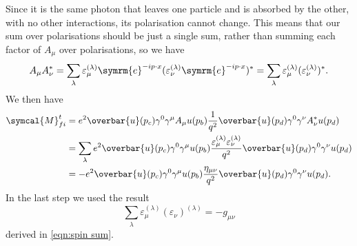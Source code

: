 \documentclass[fleqn]{NotesClass}
\newcommand{\e}{\symrm{e}}
\newcommand{\amplitude}{\symcal{M}}
\newcommand{\diracadjoint}[1]{\overbar{#1}}
\newcommand{\minkowskiMetric}{\eta}
\begin{document}
    Since it is the same photon that leaves one particle and is absorbed by the other, with no other interactions, its polarisation cannot change.
    This means that our sum over polarisations should be just a single sum, rather than summing each factor of \(A_\mu\) over polarisations, so we have
    \begin{equation}
        A_\mu A_\nu^* = \sum_{\lambda} \varepsilon_\mu^{(\lambda)}\e^{-ip\cdot x}(\varepsilon_\nu^{(\lambda)} \e^{-ip\cdot x})^* = \sum_{\lambda} \varepsilon_\mu^{(\lambda)} (\varepsilon_\nu^{(\lambda)})^*.
    \end{equation}
    We then have
    \begin{align}
        \amplitude_{fi}^t &= e^2 \diracadjoint{u}(p_c) \gamma^0\gamma^\mu A_\mu u(p_b) \frac{1}{q^2} \diracadjoint{u}(p_d) \gamma^0\gamma^\nu A_\nu^* u(p_d)\\
        &= \sum_\lambda e^2 \diracadjoint{u}(p_c) \gamma^0 \gamma^\mu u(p_b) \frac{\varepsilon_\mu^{(\lambda)} \varepsilon_\nu^{(\lambda)}}{q^2} \diracadjoint{u}(p_d) \gamma^0\gamma^\nu u(p_d)\\
        &= -e^2 \diracadjoint{u}(p_c) \gamma^0 \gamma^\mu u(p_b) \frac{\minkowskiMetric_{\mu\nu}}{q^2} \diracadjoint{u}(p_d) \gamma^0\gamma^\nu u(p_d).\label{eqn:electron tau scattering amplitude}
    \end{align}
    In the last step we used the result
    \begin{equation}
        \sum_\lambda \varepsilon_\mu^{(\lambda)}(\varepsilon_\nu)^{(\lambda)} = -g_{\mu\nu}
    \end{equation}
    derived in \cref{eqn:spin sum}.
    
    
    \appendixpage
    \begin{appendices}
        
        
        
    \end{appendices}
    
    \backmatter
    \renewcommand{\glossaryname}{Acronyms}
    \printglossary[acronym]
    \printindex
\end{document}
